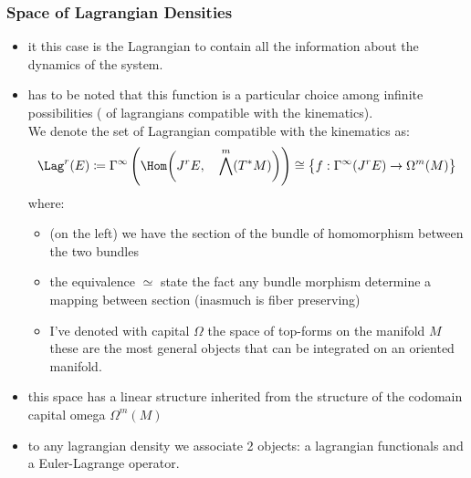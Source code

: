 \documentclass[a4paper,11pt]{scrartcl}
\begin{document}
    \subsubsection*{Space of Lagrangian Densities}
    \begin{itemize}
        \item it this case is the Lagrangian to contain all the information about the dynamics of the system.
        \item has to be noted that this function is a particular choice among infinite possibilities ( of lagrangians compatible with the kinematics).\\
        We denote the set of Lagrangian compatible with the kinematics as:
        $$ \Lag^r (E) \coloneqq \Gamma^\infty \left( \Hom\biggr(J^r E,\quad \bigwedge^m( T^*M)\biggr) \right) \cong \big\{f:\Gamma^\infty(J^r E) \rightarrow \Omega^m(M)  \big\} $$
        where:
        \begin{itemize}
            \item (on the left) we have the section of the bundle of homomorphism between the two bundles
            \item the equivalence $\simeq$ state the fact any bundle morphism determine a mapping between section (inasmuch is fiber preserving)
            \item I've denoted with capital $\Omega$ the space of top-forms on the manifold $M$\\
            these are the most general objects that can be integrated on an oriented manifold.
        \end{itemize}
        \item this space has a linear structure inherited from the structure of the codomain capital omega $\Omega^m(M)$
        \item to any lagrangian density we associate 2 objects: a lagrangian functionals and a Euler-Lagrange operator.
    \end{itemize}
\end{document}
